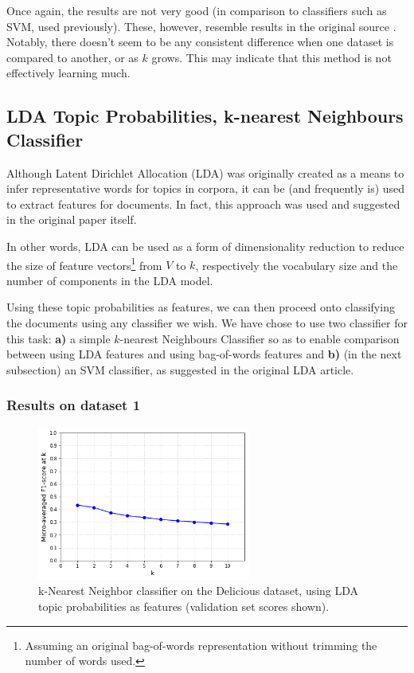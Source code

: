 Once again, the results are not very good (in comparison to classifiers such as SVM, used previously). These, however, resemble results in the original source \citep{choubey_2011}. Notably, there doesn't seem to be any consistent difference when one dataset is compared to another, or as $k$ grows. This may indicate that this method is not effectively learning much.

\subsection{LDA Topic Probabilities, k-nearest Neighbours Classifier}\label{sub:lda_topics}

Although Latent Dirichlet Allocation (LDA) \citep{blei_etal_2003} was originally created as a means to infer representative words for topics in corpora, it can be (and frequently is) used to extract features for documents. In fact, this approach was used and suggested in the original paper itself.

In other words, LDA can be used as a form of dimensionality reduction to reduce the size of feature vectors\footnote{Assuming an original bag-of-words representation without trimming the number of words used.} from $V$ to $k$, respectively the vocabulary size and the number of components in the LDA model.

Using these topic probabilities as features, we can then proceed onto classifying the documents using any classifier we wish. We have chose to use two classifier for this task: \textbf{a)} a simple $k$-nearest Neighbours Classifier so as to enable comparison between using LDA features and using bag-of-words features and \textbf{b)} (in the next subsection) an SVM classifier, as suggested in the original LDA article.

\subsubsection{Results on dataset 1}

\begin{figure}[H]
    \centering
    \includegraphics[width=7cm]{chapters/05_experiments/images/knn-lda-delicious.png}
    \caption{k-Nearest Neighbor classifier on the Delicious dataset, using LDA topic probabilities as features (validation set scores shown).}
    \label{fig:knn_lda_delicious}
\end{figure}


